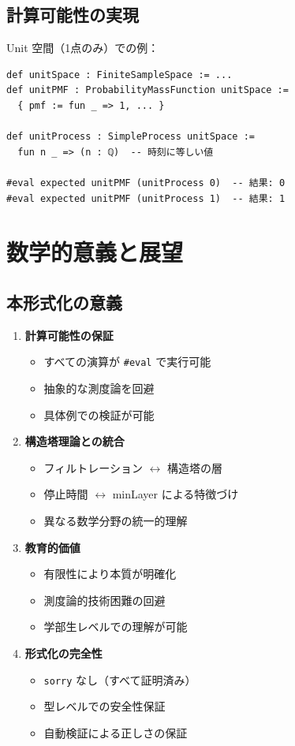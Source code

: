 \documentclass[a4paper,12pt]{ltjsarticle}
\theoremstyle{definition}
\begin{document}
\subsection{計算可能性の実現}

\begin{computation}[実行可能な例]
Unit 空間（1点のみ）での例：
\begin{verbatim}
def unitSpace : FiniteSampleSpace := ...
def unitPMF : ProbabilityMassFunction unitSpace :=
  { pmf := fun _ => 1, ... }

def unitProcess : SimpleProcess unitSpace :=
  fun n _ => (n : ℚ)  -- 時刻に等しい値

#eval expected unitPMF (unitProcess 0)  -- 結果: 0
#eval expected unitPMF (unitProcess 1)  -- 結果: 1
\end{verbatim}
\end{computation}

\section{数学的意義と展望}

\subsection{本形式化の意義}

\begin{enumerate}
\item \textbf{計算可能性の保証}
  \begin{itemize}
    \item すべての演算が \texttt{\#eval} で実行可能
    \item 抽象的な測度論を回避
    \item 具体例での検証が可能
  \end{itemize}

\item \textbf{構造塔理論との統合}
  \begin{itemize}
    \item フィルトレーション $\leftrightarrow$ 構造塔の層
    \item 停止時間 $\leftrightarrow$ minLayer による特徴づけ
    \item 異なる数学分野の統一的理解
  \end{itemize}

\item \textbf{教育的価値}
  \begin{itemize}
    \item 有限性により本質が明確化
    \item 測度論的技術困難の回避
    \item 学部生レベルでの理解が可能
  \end{itemize}

\item \textbf{形式化の完全性}
  \begin{itemize}
    \item \texttt{sorry} なし（すべて証明済み）
    \item 型レベルでの安全性保証
    \item 自動検証による正しさの保証
  \end{itemize}
\end{enumerate}
\end{document}
